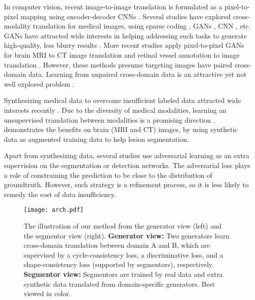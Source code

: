 \documentclass[10pt,twocolumn,letterpaper]{article}
\begin{document}
In computer vision, recent image-to-image translation is formulated as a pixel-to-pixel mapping using encoder-decoder CNNs  \cite{isola2016image,liu2017unsupervised,zhu2017unpaired,kim2017learning,liu2017unsupervised,xue2017differential,gong2017learning}. 
Several studies have explored cross-modality translation for medical images, using sparse coding \cite{huang2017simultaneous,vemulapalli2015unsupervised}, GANs \cite{nie2016medical,osokin2017gans}, CNN \cite{van2015cross}, etc. GANs have attracted wide interests in helping addressing such tasks to generate high-quality, less blurry results \cite{goodfellow2014generative,arjovsky2017wasserstein,berthelot2017began,zhang2018txt2img}.
More recent studies apply pixel-to-pixel GANs for brain MRI to CT image translation \cite{nie2016medical,kamnitsas2017unsupervised} and retinal vessel annotation to image translation \cite{costa2017towards}. However, these methods presume targeting images have paired cross-domain data. Learning from unpaired cross-domain data is an attractive yet not well explored problem \cite{vemulapalli2015unsupervised,liu2016coupled}.


Synthesizing medical data to overcome insufficient labeled data attracted wide interests recently \cite{shrivastava2016learning,iglesias2013synthesizing,huo2017adversarial}. 
Due to the diversity of medical modalities, learning an unsupervised translation between modalities is a promising direction \cite{costa2017towards}.  
\cite{kamnitsas2017unsupervised} demonstrates the benefits on brain (MRI and CT) images, by using synthetic data as augmented training data to help lesion segmentation. 

Apart from synthesizing data, several studies \cite{kohl2017adversarial,luc2016semantic,yang2017automatic,xue2017segan} use adversarial learning as an extra supervision on the segmentation or detection networks. The adversarial loss plays a role of constraining the prediction to be close to the distribution of groundtruth. However, such strategy is a refinement process, so it is less likely to remedy the cost of data insufficiency. 


\begin{figure*}[t]
	\begin{center}
		\texttt{[image: arch.pdf]}
	\end{center}
	\vspace{-.2cm}
	\caption{The illustration of our method from the generator view (left) and the segmentor view (right). \textbf{Generator view:} Two generators learn cross-domain translation between domain A and B, which are supervised by a cycle-consistency loss, a discriminative loss, and a shape-consistency loss (supported by segmentors), respectively. \textbf{Segmentor view:} Segmentors are trained by real data and extra synthetic data translated from domain-specific generators. Best viewed in color. \vspace{-.4cm}} \label{fig:arch}
\end{figure*}
\end{document}
